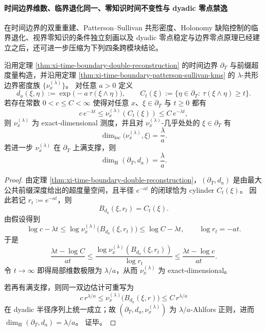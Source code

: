 \paragraph{时间边界维数、临界退化同一、零知识时间不变性与 dyadic 零点禁逸}
在时间边界的双重重建、Patterson--Sullivan 共形密度、Holonomy 缺陷控制的临界退化、视界零知识的条件独立刻画以及 dyadic 零点稳定与边界零点原理已经建立之后，还可进一步压缩为下列四条跨模块结论。

\begin{theorem}\label{thm:xi-time-part9q-patterson-sullivan-boundary-dimension}
沿用定理 \ref{thm:xi-time-boundary-double-reconstruction} 的时间边界 \(\partial_T\) 与前缀超度量构造，并沿用定理 \ref{thm:xi-time-boundary-patterson-sullivan-kms} 的 \(\lambda\)-共形边界密度族 \(\{\nu_x^{(\lambda)}\}\)。
对任意 \(a>0\) 定义
\[
d_a(\xi,\eta):=\exp\!\bigl(-a\,\tau(\xi\wedge\eta)\bigr),
\qquad
C_t(\xi):=\{\eta\in\partial_T:\ \tau(\xi\wedge\eta)\ge t\}.
\]
若存在常数 \(0<c\le C<\infty\) 使得对任意 \(x\)、\(\xi\in\partial_T\) 与 \(t\ge 0\) 都有
\[
c\,e^{-\lambda t}\le \nu_x^{(\lambda)}(C_t(\xi))\le C\,e^{-\lambda t},
\]
则 \(\nu_x^{(\lambda)}\) 为 exact-dimensional 测度，并且对 \(\nu_x^{(\lambda)}\)-几乎处处的 \(\xi\in\partial_T\) 有
\[
\dim_{\mathrm{loc}}\bigl(\nu_x^{(\lambda)},\xi\bigr)=\frac{\lambda}{a}.
\]
若进一步 \(\nu_x^{(\lambda)}\) 在 \(\partial_T\) 上满支撑，则
\[
\dim_{\mathrm H}(\partial_T,d_a)=\frac{\lambda}{a}.
\]
\end{theorem}
\begin{proof}
由定理 \ref{thm:xi-time-boundary-double-reconstruction}，\((\partial_T,d_a)\) 是由最大公共前缀深度给出的超度量空间，且半径 \(e^{-at}\) 的闭球恰为 cylinder \(C_t(\xi)\)。
因此若记 \(r_t:=e^{-at}\)，则
\[
B_{d_a}(\xi,r_t)=C_t(\xi).
\]
由假设得到
\[
\log c-\lambda t
\le
\log \nu_x^{(\lambda)}\bigl(B_{d_a}(\xi,r_t)\bigr)
\le
\log C-\lambda t,
\qquad
\log r_t=-at.
\]
于是
\[
\frac{\lambda t-\log C}{at}
\le
\frac{\log \nu_x^{(\lambda)}(B_{d_a}(\xi,r_t))}{\log r_t}
\le
\frac{\lambda t-\log c}{at}.
\]
令 \(t\to\infty\) 即得局部维数极限为 \(\lambda/a\)，从而 \(\nu_x^{(\lambda)}\) 为 exact-dimensional。

若再有满支撑，则同一双边估计可重写为
\[
c\,r^{\lambda/a}\le \nu_x^{(\lambda)}\bigl(B_{d_a}(\xi,r)\bigr)\le C\,r^{\lambda/a}
\]
在 dyadic 半径序列上统一成立；故 \((\partial_T,d_a,\nu_x^{(\lambda)})\) 为 \(\lambda/a\)-Ahlfors 正则，进而
\(
\dim_{\mathrm H}(\partial_T,d_a)=\lambda/a
\)。
证毕。
\end{proof}

